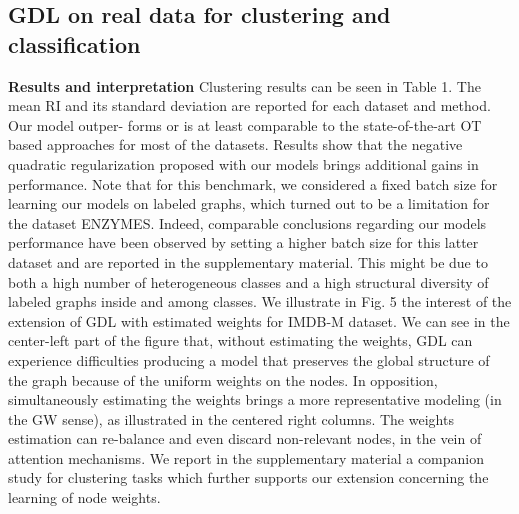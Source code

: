 \documentclass[preprint,11pt]{elsarticle}
\begin{document}
    \subsection{GDL on real data for clustering and classification}
    \textbf{Results and interpretation}   Clustering results can be
 seen in Table 1. The mean RI and its standard deviation are
 reported for each dataset and method. Our model outper-
forms or is at least comparable to the state-of-the-art OT
 based approaches for most of the datasets. Results show
 that the negative quadratic regularization proposed with our
 models brings additional gains in performance. Note that for
 this benchmark, we considered a fixed batch size for learning our models on labeled graphs, which turned out to be a
 limitation for the dataset ENZYMES. Indeed, comparable
 conclusions regarding our models performance have been
 observed by setting a higher batch size for this latter dataset and are reported in the supplementary material. This might be due to both a high number of heterogeneous classes and a high structural diversity of labeled graphs inside and among classes. We illustrate in Fig. 5 the interest of the extension of GDL with estimated weights for IMDB-M dataset. We can see in the center-left part of the figure that, without estimating the weights, GDL can experience difficulties producing a model that preserves the global structure of the graph because of the uniform weights on the nodes. In opposition, simultaneously estimating the weights brings a more representative modeling (in the GW sense), as illustrated in the centered right columns. The weights estimation can re-balance and even discard non-relevant nodes, in the vein of attention mechanisms. We report in the supplementary material a companion study for clustering tasks which further supports our extension concerning the learning of node weights.
\end{document}
